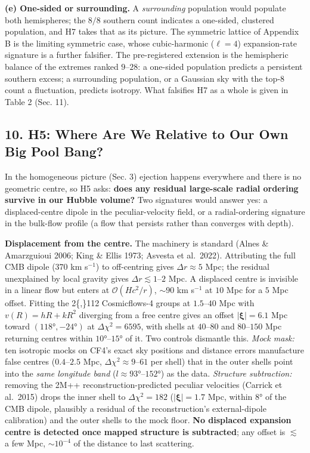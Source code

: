 \documentclass[
]{article}
\begin{document}
\textbf{(e) One-sided or surrounding.} A \emph{surrounding} population
would populate both hemispheres; the \(8/8\) southern count indicates a
one-sided, clustered population, and H7 takes that as its picture. The
symmetric lattice of Appendix B is the limiting symmetric case, whose
cubic-harmonic (\(\ell = 4\)) expansion-rate signature is a further
falsifier. The pre-registered extension is the hemispheric balance of
the extremes ranked \(9\)--\(28\): a one-sided population predicts a
persistent southern excess; a surrounding population, or a Gaussian sky
with the top-8 count a fluctuation, predicts isotropy. What falsifies H7
as a whole is given in Table 2 (Sec. 11).

\hypertarget{h5-where-are-we-relative-to-our-own-big-pool-bang}{%
\subsection{\texorpdfstring{\textbf{10. H5: Where Are We Relative to Our
Own Big Pool
Bang?}}{10. H5: Where Are We Relative to Our Own Big Pool Bang?}}\label{h5-where-are-we-relative-to-our-own-big-pool-bang}}

In the homogeneous picture (Sec. 3) ejection happens everywhere and
there is no geometric centre, so H5 asks: \textbf{does any residual
large-scale radial ordering survive in our Hubble volume?} Two
signatures would answer yes: a displaced-centre dipole in the
peculiar-velocity field, or a radial-ordering signature in the bulk-flow
profile (a flow that persists rather than converges with depth).

\textbf{Displacement from the centre.} The machinery is standard (Alnes
\& Amarzguioui 2006; King \& Ellis 1973; Asvesta et al.~2022).
Attributing the full CMB dipole (\(370\) km s\(^{-1}\)) to off-centring
gives \(\Delta r \approx 5\) Mpc; the residual unexplained by local
gravity gives \(\Delta r \lesssim 1\)--\(2\) Mpc. A displaced centre is
invisible in a linear flow but enters at \(\mathcal{O}(Hc^2/r)\),
\(\sim\!90\) km s\(^{-1}\) at \(10\) Mpc for a \(5\) Mpc offset. Fitting
the 2\{,\}112 Cosmicflows-4 groups at \(1.5\)--\(40\) Mpc with
\(v(R) = hR + kR^2\) diverging from a free centre gives an offset
\(|\boldsymbol{\xi}| = 6.1\) Mpc toward \((118°, -24°)\) at
\(\Delta\chi^2 = 6595\), with shells at \(40\)--\(80\) and
\(80\)--\(150\) Mpc returning centres within \(10°\)--\(15°\) of it. Two
controls dismantle this. \emph{Mock mask:} ten isotropic mocks on CF4's
exact sky positions and distance errors manufacture false centres
(\(0.4\)--\(2.5\) Mpc, \(\Delta\chi^2 \approx 9\)--\(61\) per shell)
that in the outer shells point into the \emph{same longitude band}
(\(l \approx 93°\)--\(152°\)) as the data. \emph{Structure subtraction:}
removing the 2M++ reconstruction-predicted peculiar velocities (Carrick
et al.~2015) drops the inner shell to \(\Delta\chi^2 = 182\)
(\(|\boldsymbol{\xi}| = 1.7\) Mpc, within \(8°\) of the CMB dipole,
plausibly a residual of the reconstruction's external-dipole
calibration) and the outer shells to the mock floor. \textbf{No
displaced expansion centre is detected once mapped structure is
subtracted}; any offset is \(\lesssim\) a few Mpc, \(\sim\!10^{-4}\) of
the distance to last scattering.
\end{document}
